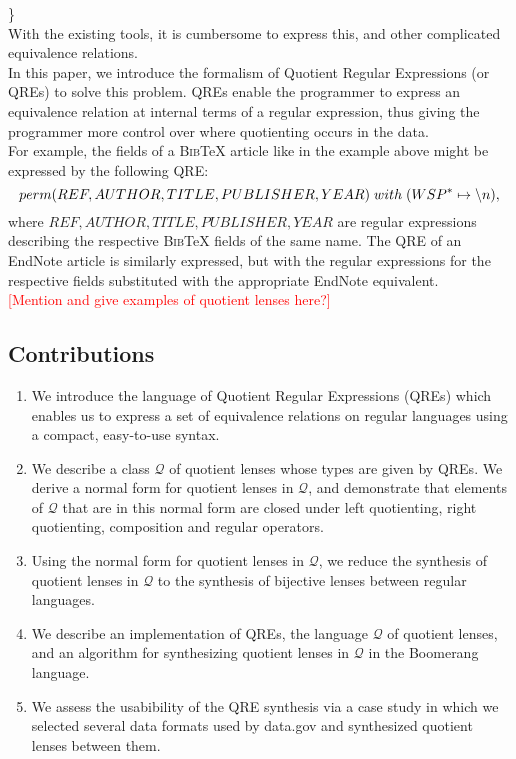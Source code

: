 \documentclass{svproc}
\begin{document}
    \newline
\}\\
\newline
With the existing tools, it is cumbersome to express this, and other complicated
equivalence relations.\\
In this paper, we introduce the formalism of Quotient Regular Expressions (or
QREs) to solve this problem. QREs enable the programmer to express an
equivalence relation at internal terms of a regular expression, thus giving
the programmer more control over where quotienting occurs in the data.\\
For example, the fields of a \textsc{Bib}\TeX\; article like in the example
above might be expressed by the following QRE:
$$perm(REF, AUTHOR, TITLE, PUBLISHER, YEAR) \; with \; (WSP^* \mapsto \string
\n),$$ where $REF, AUTHOR, TITLE, PUBLISHER, YEAR$ are regular expressions
describing the respective \textsc{Bib}\TeX\; fields of the same name. The QRE of
an EndNote article is similarly expressed, but with the regular expressions for
the respective fields substituted with the appropriate EndNote equivalent.\\
\textcolor{red}{[Mention and give examples of quotient lenses here?]}
\subsection{Contributions}
\begin{enumerate}
  \item
  We introduce the language of Quotient Regular Expressions (QREs) which enables
  us to express a set of equivalence relations on regular languages using a
  compact, easy-to-use syntax.
  \item
  We describe a class $\mathcal{Q}$ of quotient lenses whose types are given by
  QREs. We derive a normal form for quotient lenses in $\mathcal{Q}$, and
  demonstrate that elements of $\mathcal{Q}$ that are in this normal form are
  closed under left quotienting, right quotienting, composition and regular
  operators.
  \item
  Using the normal form for quotient lenses in $\mathcal{Q}$, we reduce the
  synthesis of quotient lenses in $\mathcal{Q}$ to the synthesis of bijective
  lenses between regular languages. 
  \item
  We describe an implementation of QREs, the language $\mathcal{Q}$ of quotient
  lenses, and an algorithm for synthesizing quotient lenses in $\mathcal{Q}$ in
  the Boomerang language.
  \item
  We assess the usabibility of the QRE synthesis via a case study in which we
  selected several data formats used by data.gov and synthesized quotient lenses
  between them.
\end{enumerate}
\end{document}
